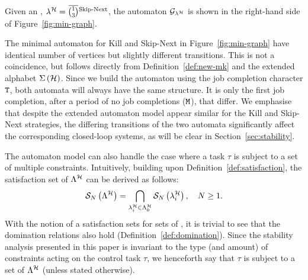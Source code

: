\begin{example}%
    \label{ex:auto-skip}%
    Given an \ewhc{}, $\lambda^{\strat} = \overbar{\binom{1}{3}}^{\text{Skip-Next}}$, the automaton $\mathcal{G}_{\lambda^{\mathcal{H}}}$ is shown in the right-hand side of Figure~\ref{fig:min-graph}.
\end{example}

The minimal automaton for Kill and Skip-Next in Figure~\ref{fig:min-graph} have identical number of vertices but slightly different transitions.
This is not a coincidence, but follows directly from Definition~\ref{def:new-mk} and the extended alphabet $\Sigma\left(\mathcal{H}\right)$.
Since we build the automaton using the job completion character $\texttt{T}$, both automata will always have the same structure.
It is only the first job completion, after a period of no job completions ($\texttt{M}$), that differ.
We emphasise that despite the extended automaton model appear similar for the Kill and Skip-Next strategies, the differing transitions of the two automata significantly affect the corresponding closed-loop systems, as will be clear in Section~\ref{sec:stability}.

%        

The \tool{} automaton model can also handle the case where a task $\tau$ is subject to a set of multiple constraints.
Intuitively, building upon Definition~\ref{def:satisfaction}, the satisfaction set of $\Lambda^{\mathcal{H}}$ can be derived as follows:
%
\begin{equation}
    \label{eq:satisfaction-multi}
    \sset{N}{\Lambda^{\strat}} = \bigcap_{\lambda^{\strat}_i \in \Lambda^{\strat}_0} \sset{N}{\lambda^{\strat}_i}, \quad N \geq 1.
\end{equation}
%
With the notion of a satisfaction sets for sets of \ewhc{}, it is trivial to see that the domination relations also hold (Definition~\ref{def:domination}).
Since the stability analysis presented in this paper is invariant to the type (and amount) of constraints acting on the control task $\tau$, we henceforth say that $\tau$ is subject to a set of \ewhc{} $\Lambda^{\mathcal{H}}$ (unless stated otherwise).
%


